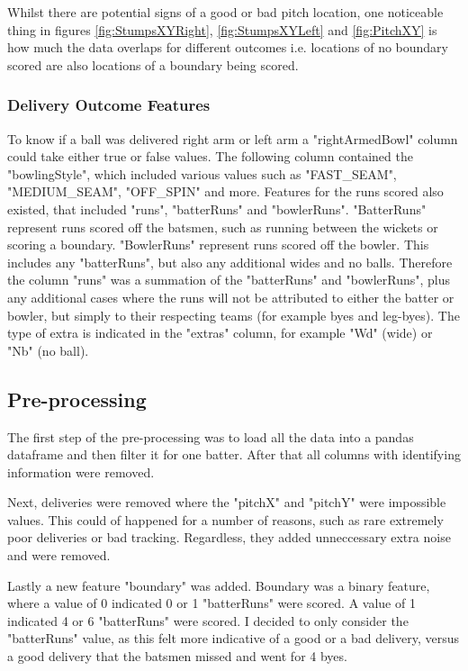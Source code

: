 \documentclass[12pt,a4paper]{report}
\theoremstyle{definition}
\begin{document}
Whilst there are potential signs of a good or bad pitch location, one noticeable thing in figures \ref{fig:StumpsXYRight}, \ref{fig:StumpsXYLeft} and \ref{fig:PitchXY} is how much the data overlaps for different outcomes i.e. locations of no boundary scored are also locations of a boundary being scored.

\subsubsection{Delivery Outcome Features}

To know if a ball was delivered right arm or left arm a "rightArmedBowl" column could take either true or false values.
The following column contained the "bowlingStyle", which included various values such as "FAST\_SEAM", "MEDIUM\_SEAM",  "OFF\_SPIN" and more.
Features for the runs scored also existed, that included "runs", "batterRuns" and "bowlerRuns". 
"BatterRuns" represent runs scored off the batsmen, such as running between the wickets or scoring a boundary.
"BowlerRuns" represent runs scored off the bowler. 
This includes any "batterRuns", but also any additional wides and no balls.
Therefore the column "runs" was a summation of the "batterRuns" and "bowlerRuns", plus any additional cases where the runs will not be attributed to either the batter or bowler, but simply to their respecting teams (for example byes and leg-byes).
The type of extra is indicated in the "extras" column, for example "Wd" (wide) or "Nb" (no ball).

\subsection{Pre-processing}

The first step of the pre-processing was to load all the data into a pandas dataframe and then filter it for one batter.
After that all columns with identifying information were removed.

Next, deliveries were removed where the "pitchX" and "pitchY" were impossible values. 
This could of happened for a number of reasons, such as rare extremely poor deliveries or bad tracking.
Regardless, they added unneccessary extra noise and were removed.

Lastly a new feature "boundary" was added. 
Boundary was a binary feature, where a value of 0 indicated 0 or 1 "batterRuns" were scored.
A value of 1 indicated 4 or 6 "batterRuns" were scored. 
I decided to only consider the "batterRuns" value, as this felt more indicative of a good or a bad delivery, versus a good delivery that the batsmen missed and went for 4 byes.
\end{document}
